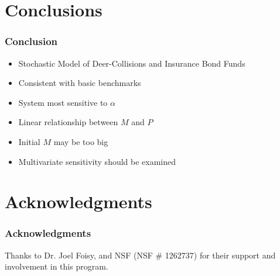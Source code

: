 \documentclass{beamer}   %
\begin{document}
\section{Conclusions}

\begin{frame}
  \frametitle{Conclusion}
  \begin{itemize}
  \item Stochastic Model of Deer-Collisions and Insurance Bond Funds 
  \item Consistent with basic benchmarks
  \item System most sensitive to $\alpha$
  \item Linear relationship between $M$ and $P$
  \item Initial $M$ may be too big
  \item Multivariate sensitivity should be examined
  \end{itemize}
\end{frame}







\section{Acknowledgments}

\begin{frame}
  \frametitle{Acknowledgments}
  Thanks to Dr. Joel Foisy, and NSF (NSF \# 1262737) for their
  support and involvement in this program.
\end{frame}
\end{document}
